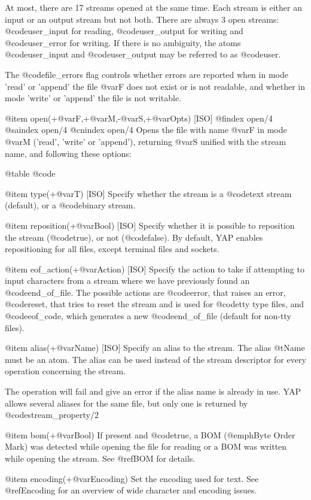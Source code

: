 {{{{At most, there are 17 streams  opened at the same time. Each stream is
either an input or an output stream but not both. There are always 3
open streams:  @code{user_input} for reading, @code{user_output} for writing
and @code{user_error} for writing. If there is no  ambiguity, the atoms
@code{user_input} and @code{user_output} may be referred to as  @code{user}.

The @code{file_errors} flag controls whether errors are reported when in
mode 'read' or 'append' the file @var{F} does not exist or is not
readable, and whether in mode 'write' or 'append' the file is not
writable.

@item open(+@var{F},+@var{M},-@var{S},+@var{Opts}) [ISO]
@findex open/4
@saindex open/4
@cnindex open/4
Opens the file with name @var{F} in mode @var{M} ('read',  'write' or
'append'), returning @var{S} unified with the stream name, and following
these options:

@table @code

@item type(+@var{T}) [ISO]
Specify whether the stream is a @code{text} stream (default), or a
@code{binary} stream.

@item reposition(+@var{Bool}) [ISO]
Specify whether it is possible to reposition the stream (@code{true}), or
not (@code{false}). By default, YAP enables repositioning for all
files, except terminal files and sockets.

@item eof_action(+@var{Action}) [ISO]
Specify the action to take if attempting to input characters from a
stream where we have previously found an @code{end_of_file}. The possible
actions are @code{error}, that raises an error, @code{reset}, that tries to
reset the stream and is used for @code{tty} type files, and @code{eof_code},
which generates a new @code{end_of_file} (default for non-tty files).

@item alias(+@var{Name}) [ISO]
Specify an alias to the stream. The alias @t{Name} must be an atom. The
alias can be used instead of the stream descriptor for every operation
concerning the stream.

The operation will fail and give an error if the alias name is already
in use. YAP allows several aliases for the same file, but only
one is returned by @code{stream_property/2}

@item bom(+@var{Bool})
If present and @code{true}, a BOM (@emph{Byte Order Mark}) was
detected while opening the file for reading or a BOM was written while
opening the stream. See @ref{BOM} for details.

@item encoding(+@var{Encoding})
Set the encoding used for text.  See @ref{Encoding} for an overview of
wide character and encoding issues.

}}}}
